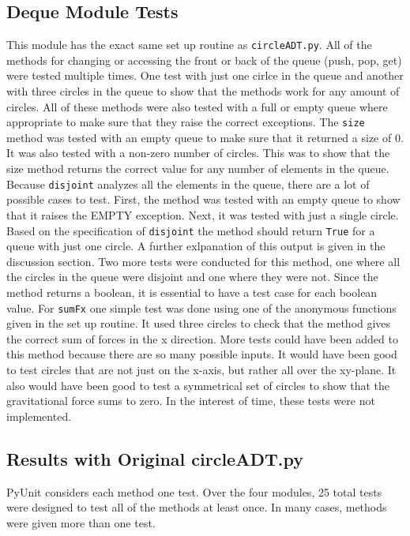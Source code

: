 \documentclass[12pt]{article}
\begin{document}
\subsection{Deque Module Tests}

This module has the exact same set up routine as {\tt circleADT.py}. All of the methods for changing or accessing the front or back of the queue (push, pop, get) were tested multiple times. One test with just one cirlce in the queue and another with three circles in the queue to show that the methods work for any amount of circles. All of these methods were also tested with a full or empty queue where appropriate to make sure that they raise the correct exceptions. The {\tt size} method was tested with an empty queue to make sure that it returned a size of 0. It was also tested with a non-zero number of circles. This was to show that the size method returns the correct value for any number of elements in the queue. Because {\tt disjoint} analyzes all the elements in the queue, there are a lot of possible cases to test. First, the method was tested with an empty queue to show that it raises the 	EMPTY exception. Next, it was tested with just a single circle. Based on the specification of {\tt disjoint} the method should return {\tt True} for a queue with just one circle. A further exlpanation of this output is given in the discussion section. Two more tests were conducted for this method, one where all the circles in the queue were disjoint and one where they were not. Since the method returns a boolean, it is essential to have a test case for each boolean value. For {\tt sumFx} one simple test was done using one of the anonymous functions given in the set up routine. It used three circles to check that the method gives the correct sum of forces in the x direction. More tests could have been added to this method because there are so many possible inputs. It would have been good to test circles that are not just on the x-axis, but rather all over the xy-plane. It also would have been good to test a symmetrical set of circles to show that the gravitational force sums to zero. In the interest of time, these tests were not implemented. 

\subsection{Results with Original circleADT.py}

PyUnit considers each method one test. Over the four modules, 25 total tests were designed to test all of the methods at least once. In many cases, methods were given more than one test.
\end{document}
